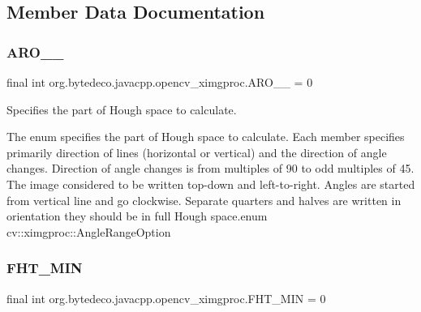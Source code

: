 \subsection{Member Data Documentation}
\mbox{\label{classorg_1_1bytedeco_1_1javacpp_1_1opencv__ximgproc_a6ed38d0dcc0c7f6bc43bba246c808e68}} 
\subsubsection{\texorpdfstring{A\+R\+O\+\_\+\_}{ARO\_0\_45}}
{\footnotesize\ttfamily final int org.\+bytedeco.\+javacpp.\+opencv\+\_\+ximgproc.\+A\+R\+O\+\_\+\_ = 0\hspace{0.3cm}{\ttfamily [static]}}



Specifies the part of Hough space to calculate. 

The enum specifies the part of Hough space to calculate. Each member specifies primarily direction of lines (horizontal or vertical) and the direction of angle changes. Direction of angle changes is from multiples of 90 to odd multiples of 45. The image considered to be written top-\/down and left-\/to-\/right. Angles are started from vertical line and go clockwise. Separate quarters and halves are written in orientation they should be in full Hough space.\+enum cv\+::ximgproc\+::\+Angle\+Range\+Option \mbox{\label{classorg_1_1bytedeco_1_1javacpp_1_1opencv__ximgproc_a59bbfb5aee70839b4d80fa69ed463326}} 
\subsubsection{\texorpdfstring{F\+H\+T\+\_\+\+M\+IN}{FHT\_MIN}}
{\footnotesize\ttfamily final int org.\+bytedeco.\+javacpp.\+opencv\+\_\+ximgproc.\+F\+H\+T\+\_\+\+M\+IN = 0\hspace{0.3cm}{\ttfamily [static]}}



